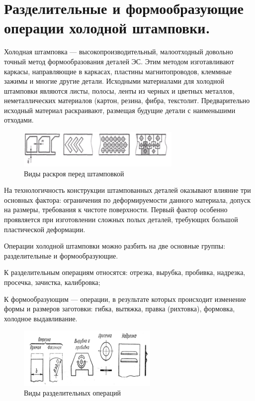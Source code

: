 \documentclass[unicode, 12pt, a4paper, oneside]{article}
\begin{document}
\section{Разделительные и формообразующие операции холодной штамповки.}

Холодная штамповка — высокопроизводительный, малоотходный довольно точный метод формообразования деталей ЭС. Этим методом изготавливают каркасы, направляющие в каркасах, пластины магнитопроводов, клеммные зажимы и многие другие детали. Исходными материалами для холодной штамповки являются листы, полосы, ленты из черных и цветных металлов, неметаллических материалов (картон, резина, фибра, текстолит. Предварительно исходный материал раскраивают, размещая будущие детали с наименьшими отходами.

\begin{figure}[htbp]
\centering
\includegraphics[width=0.7\textwidth]{98_cutting.png}
\caption{Виды раскроя перед штамповкой}
\label{fig:98_cutting}
\end{figure}

На технологичность конструкции штампованных деталей оказывают влияние три основных фактора: ограничения по деформируемости данного материала, допуск на размеры, требования к чистоте поверхности. Первый фактор особенно проявляется при изготовлении сложных полых деталей, требующих большой пластической деформации.

Операции холодной штамповки можно разбить на две основные группы: разделительные и формообразующие. 

К разделительным операциям относятся: отрезка, вырубка, пробивка, надрезка, просечка, зачистка, калибровка; 

К формообразующим — операции, в результате которых происходит изменение формы и размеров заготовки: гибка, вытяжка, правка (рихтовка), формовка, холодное выдавливание.

\begin{figure}[htbp]
\centering
\includegraphics[width=0.6\textwidth]{98_operations.png}
\caption{Виды разделительных операций}
\label{fig:98_operations}
\end{figure}
\end{document}

